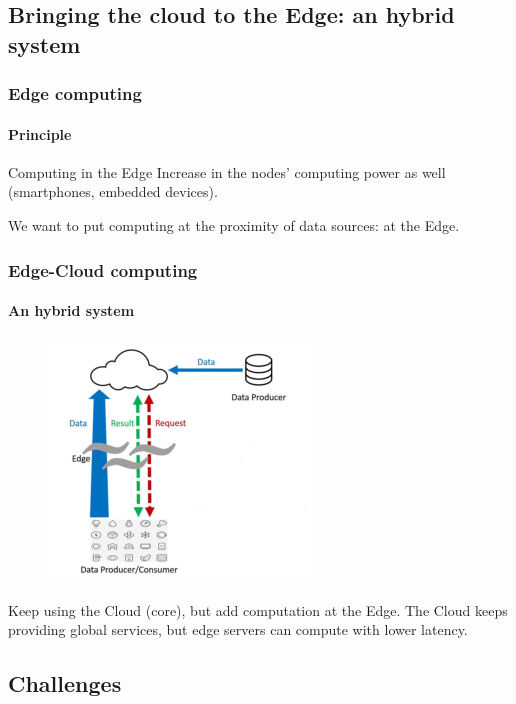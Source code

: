 \documentclass[utf8,xcolor=table, page number]{earlywinter}
\begin{document}
\subsection{Bringing the cloud to the Edge: an hybrid system} %
\begin{frame}
  \frametitle{Edge computing}
  \framesubtitle{Principle}

  \begin{block}{Computing in the Edge}
    Increase in the nodes' computing power as well (smartphones, embedded devices).
  \end{block}
   We want to put computing at the proximity of data sources: at the Edge.
  

\end{frame}

\begin{frame}
  \frametitle{Edge-Cloud computing}
  \framesubtitle{An hybrid system}

  \begin{figure}
    \center
    \includegraphics[scale=0.5]{edge.png}  %
  \end{figure}

  Keep using the Cloud (core), but add computation at the Edge.
  The Cloud keeps providing global services, but edge servers can compute with lower latency.
  
\end{frame}

\subsection{Challenges}

\end{document}
